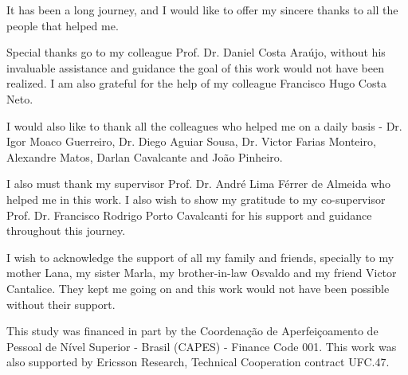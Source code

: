 \begin{agradecimentos}
It has been a long journey, and I would like to offer my sincere thanks to all the people that helped me.

Special thanks go to my colleague Prof. Dr. Daniel Costa Araújo, without his invaluable assistance and guidance the goal of this work would not have been realized.
%
I am also grateful for the help of my colleague Francisco Hugo Costa Neto.


I would also like to thank all the colleagues who helped me on a daily basis - Dr. Igor Moaco Guerreiro, Dr. Diego Aguiar Sousa, Dr. Victor Farias Monteiro, Alexandre Matos, Darlan Cavalcante and João Pinheiro.
%

I also must thank my supervisor Prof. Dr. André Lima Férrer de Almeida who helped me in this work.
%
I also wish to show my gratitude to my co-supervisor Prof. Dr. Francisco Rodrigo Porto Cavalcanti for his support and guidance throughout this journey.

I wish to acknowledge the support of all my family and friends, specially to my mother Lana, my sister Marla, my brother-in-law Osvaldo and my friend Victor Cantalice.
%
They kept me going on and this work would not have been possible without their support.

This study was financed in part by the Coordenação de Aperfeiçoamento de Pessoal de Nível Superior - Brasil (CAPES) - Finance Code 001.
%
This work was also supported by Ericsson Research, Technical Cooperation
contract UFC.47.


\end{agradecimentos}
